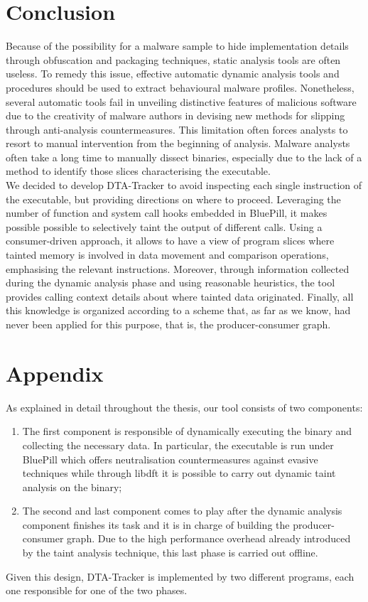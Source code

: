 \documentclass[LaM,binding=0.6cm]{sapthesis}
\begin{document}
\chapter{Conclusion}
\label{ch:futureworks}
Because of the possibility for a malware sample to hide implementation details through obfuscation and packaging techniques, static analysis tools are often useless. To remedy this issue, effective automatic dynamic analysis tools and procedures should be used to extract behavioural malware profiles. Nonetheless, several automatic tools fail in unveiling distinctive features of malicious software due to the creativity of malware authors in devising new methods for slipping through anti-analysis countermeasures. This limitation often forces analysts to resort to manual intervention from the beginning of analysis. Malware analysts often take a long time to manually dissect binaries, especially due to the lack of a method to identify those slices characterising the executable.\\

We decided to develop {\sf DTA-Tracker} to avoid inspecting each single instruction of the executable, but providing directions on where to proceed. Leveraging the number of function and system call hooks embedded in BluePill, it makes possible possible to selectively taint the output of different calls. Using a consumer-driven approach, it allows to have a view of program slices where tainted memory is involved in data movement and comparison operations, emphasising the relevant instructions. Moreover, through information collected during the dynamic analysis phase and using reasonable heuristics, the tool provides calling context details about where tainted data originated. Finally, all this knowledge is organized according to a scheme that, as far as we know, had never been applied for this purpose, that is, the producer-consumer graph.

\chapter*{Appendix}
As explained in detail throughout the thesis, our tool consists of two components:
\begin{enumerate}
\item The first component is responsible of dynamically executing the binary and collecting the necessary data. In particular, the executable is run under BluePill which offers neutralisation countermeasures against evasive techniques while through libdft it is possible to carry out dynamic taint analysis on the binary;
\item The second and last component comes to play after the dynamic analysis component finishes its task and it is in charge of building the producer-consumer graph. Due to the high performance overhead already introduced by the taint analysis technique, this last phase is carried out offline.
\end{enumerate}
Given this design, {\sf DTA-Tracker} is implemented by two different programs, each one responsible for one of the two phases.\\
\end{document}
